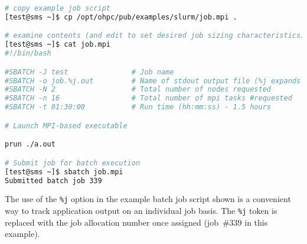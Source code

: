\begin{lstlisting}[language=bash,keywords={}]
# copy example job script
[test@sms ~]$ cp /opt/ohpc/pub/examples/slurm/job.mpi .

# examine contents (and edit to set desired job sizing characteristics)
[test@sms ~]$ cat job.mpi
#!/bin/bash

#SBATCH -J test               # Job name
#SBATCH -o job.%j.out         # Name of stdout output file (%j expands to %jobId)
#SBATCH -N 2                  # Total number of nodes requested
#SBATCH -n 16                 # Total number of mpi tasks #requested
#SBATCH -t 01:30:00           # Run time (hh:mm:ss) - 1.5 hours

# Launch MPI-based executable

prun ./a.out

# Submit job for batch execution
[test@sms ~]$ sbatch job.mpi
Submitted batch job 339
\end{lstlisting}

\begin{center}
\begin{tcolorbox}[]
\small
The use of the \texttt{\%j} option in the example batch job script shown is a convenient
way to track application output on an individual job basis. The \texttt{\%j} token
is replaced with the \SLURM{} job allocation number once assigned (job~\#339 in
this example).
\end{tcolorbox}
\end{center}


